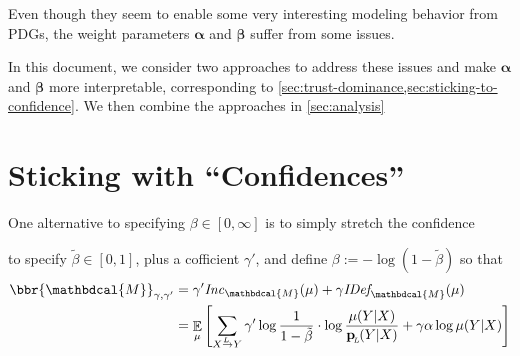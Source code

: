 \documentclass[twoside]{article} %
\theoremstyle{plain}
\theoremstyle{definition}
\DeclareMathOperator*{\Ex}{\mathbb{E}} %
\newcommand{\mat}[1]{\mathbf{#1}}
\newcommand{\ssub}[1]{_{\!_{#1}\!}}
\newcommand{\bp}[1][L]{\mat{p}\ssub{#1}}
\newcommand{\balpha}{\boldsymbol\alpha}
\newcommand{\bbeta}{\boldsymbol\beta}
\newcommand{\dg}[1]{\mathbdcal{#1}}
\newcommand\Inc{\mathit{Inc}}
\newcommand{\IDef}[1]{\mathit{IDef}_{\!#1}}
\newcommand{\ed}[3]{#2%
    	  \overset{\smash{\mskip-5mu\raisebox{-1pt}{$\scriptscriptstyle
    	        #1$}}}{\rightarrow} #3}
\begin{document}
    Even though they seem to enable some very interesting modeling behavior from PDGs, the weight parameters $\balpha$ and $\bbeta$ suffer from some issues.



    In this document, we consider two approaches to address these issues and make $\balpha$ and $\bbeta$ more interpretable, corresponding to \cref{sec:trust-dominance,sec:sticking-to-confidence}. We then combine the approaches in \cref{sec:analysis}

    \section{Sticking with ``Confidences''} 
        \label{sec:sticking-to-confidence}
        
    One alternative to specifying $\beta \in [0, \infty]$ is to simply stretch the confidence

    to specify $\tilde\beta \in [0,1]$, plus a cofficient $\gamma'$, and define
    $
        \beta := - \log ({1-\tilde\beta})
    $
    so that
    \begin{align*}
        \bbr{\dg M}_{\gamma,\gamma'}
            &= \gamma' \Inc_{\dg M}(\mu) + \gamma \IDef{\dg M}(\mu) \\
            &= \Ex_{\mu} \left[
                \sum_{\ed LXY} \gamma' \log \frac1{1-\tilde\beta}\cdot\log \frac{\mu(Y|X)}{\bp(Y|X)}  + \gamma \alpha \log \mu(Y|X)
                \right]
    \end{align*}
    
\end{document}
